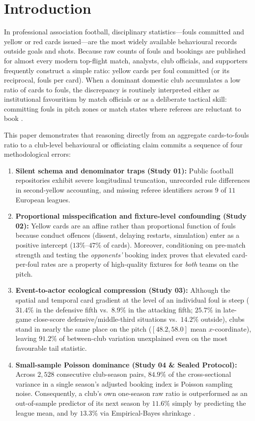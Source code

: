\documentclass[10pt,twocolumn]{article}
\begin{document}
\section{Introduction}

In professional association football, disciplinary statistics---fouls committed and yellow or red cards issued---are the most widely available behavioural records outside goals and shots. Because raw counts of fouls and bookings are published for almost every modern top-flight match, analysts, club officials, and supporters frequently construct a simple ratio: yellow cards per foul committed (or its reciprocal, fouls per card). When a dominant domestic club accumulates a low ratio of cards to fouls, the discrepancy is routinely interpreted either as institutional favouritism by match officials or as a deliberate tactical skill: committing fouls in pitch zones or match states where referees are reluctant to book \citep{phatak2021dirty,azmat2024xb}.

This paper demonstrates that reasoning directly from an aggregate cards-to-fouls ratio to a club-level behavioural or officiating claim commits a sequence of four methodological errors:
\begin{enumerate}
  \item \textbf{Silent schema and denominator traps (Study 01):} Public football repositories exhibit severe longitudinal truncation, unrecorded rule differences in second-yellow accounting, and missing referee identifiers across $9$ of $11$ European leagues.
  \item \textbf{Proportional misspecification and fixture-level confounding (Study 02):} Yellow cards are an affine rather than proportional function of fouls because conduct offences (dissent, delaying restarts, simulation) enter as a positive intercept ($13\%\text{--}47\%$ of cards). Moreover, conditioning on pre-match strength and testing the \emph{opponents'} booking index proves that elevated card-per-foul rates are a property of high-quality fixtures for \emph{both} teams on the pitch.
  \item \textbf{Event-to-actor ecological compression (Study 03):} Although the spatial and temporal card gradient at the level of an individual foul is steep ($31.4\%$ in the defensive fifth vs.\ $8.9\%$ in the attacking fifth; $25.7\%$ in late-game close-score defensive/middle-third situations vs.\ $14.2\%$ outside), clubs stand in nearly the same place on the pitch ($[48.2, 58.0]$ mean $x$-coordinate), leaving $91.2\%$ of between-club variation unexplained even on the most favourable tail statistic.
  \item \textbf{Small-sample Poisson dominance (Study 04 \& Sealed Protocol):} Across $2,528$ consecutive club-season pairs, $84.9\%$ of the cross-sectional variance in a single season's adjusted booking index is Poisson sampling noise. Consequently, a club's own one-season raw ratio is outperformed as an out-of-sample predictor of its next season by $11.6\%$ simply by predicting the league mean, and by $13.3\%$ via Empirical-Bayes shrinkage \citep{efron1975stein,brown2008season}.
\end{enumerate}
\end{document}
